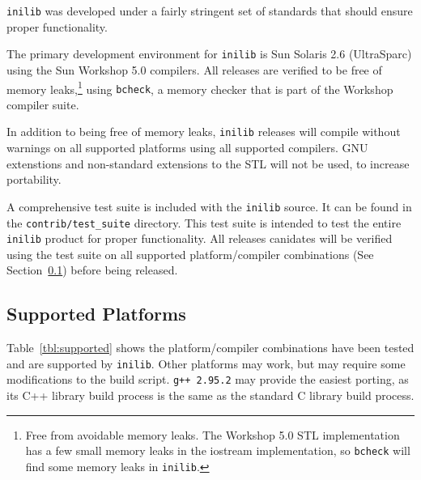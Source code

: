 {\tt inilib} was developed under a fairly stringent set of standards
that should ensure proper functionality.

The primary development environment for {\tt inilib} is Sun Solaris
2.6 (UltraSparc) using the Sun Workshop 5.0 compilers.  All releases
are verified to be free of memory leaks,\footnote{Free from avoidable
  memory leaks.  The Workshop 5.0 STL implementation has a few small
  memory leaks in the iostream implementation, so {\tt bcheck} will
  find some memory leaks in {\tt inilib}.} using {\tt bcheck}, a
memory checker that is part of the Workshop compiler suite.

In addition to being free of memory leaks, {\tt inilib} releases will
compile without warnings on all supported platforms using all
supported compilers.  GNU extenstions and non-standard extensions to
the STL will not be used, to increase portability.

A comprehensive test suite is included with the {\tt inilib} source.
It can be found in the {\tt contrib/test\_suite} directory.  This test
suite is intended to test the entire {\tt inilib} product for proper
functionality.  All releases canidates will be verified using the test
suite on all supported platform/compiler combinations (See
Section~\ref{sec:supported}) before being released.

\subsection{Supported Platforms}
\label{sec:supported}

Table~\ref{tbl:supported} shows the platform/compiler combinations
have been tested and are supported by {\tt inilib}.  Other platforms
may work, but may require some modifications to the build script.
{\tt g++ 2.95.2} may provide the easiest porting, as its C++ library
build process is the same as the standard C library build process.

